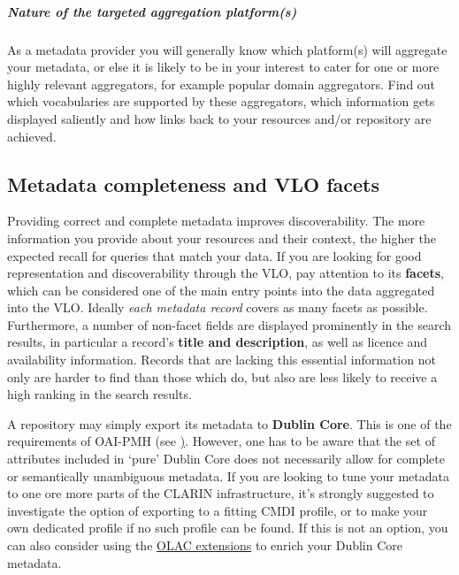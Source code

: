 \begin{workinprogress}
\subparagraph{Nature of the targeted aggregation
platform(s)} \label{nature-of-the-targeted-aggregation-platforms}

As a metadata provider you will generally know which platform(s) will aggregate your metadata, or else it is likely to be in your interest to cater for one or more highly relevant aggregators, for example popular domain aggregators. Find out which vocabularies are supported by these aggregators, which information gets displayed saliently and how links back to your resources and/or repository are achieved.

\subsection{Metadata completeness and VLO facets} \label{metadata-completeness-and-vlo-facets}

Providing correct and complete metadata improves discoverability. The more information you provide about your resources and their context, the higher the expected recall for queries that match your data. If you are looking for good representation and discoverability through the VLO, pay
attention to its \textbf{facets}, which can be considered one of the main entry points into the data aggregated into the VLO. Ideally \emph{each metadata record} covers as many facets as possible. Furthermore, a number of non-facet fields are displayed prominently in the search results, in particular a record's \textbf{title and description}, as well as licence and availability information. Records that are lacking this essential information not only are harder to find than those which do, but also are less likely to receive a high ranking
in the search results. 

A repository may simply export its metadata to \textbf{Dublin Core}. This is one of the requirements of OAI-PMH (see
\href{https://www.openarchives.org/OAI/2.0/openarchivesprotocol.2015-01-08.htm\#Record}). However, one has to be aware that the set of attributes included in `pure' Dublin Core does not necessarily allow for complete or semantically unambiguous metadata. If you are looking to tune your metadata to one ore more parts of the CLARIN infrastructure, it's strongly suggested to investigate the option of exporting to a fitting
CMDI profile, or to make your own dedicated profile if no such profile can be found. If this is not an option, you can also consider using the \href{http://www.language-archives.org/OLAC/metadata.html}{OLAC extensions} to enrich your Dublin Core metadata.


\end{workinprogress}
